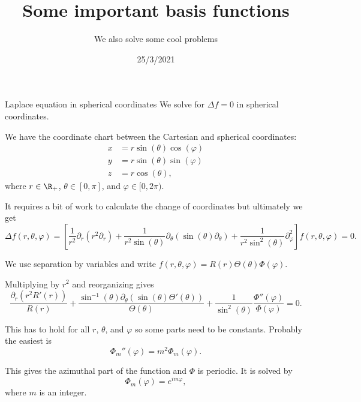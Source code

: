 

\title{Some important basis functions}
\subtitle{We also solve some cool problems}
\date{25/3/2021}
\date{}


	
	\maketitle
	

\begin{frame}{Laplace equation in spherical coordinates}
	We solve for $ \Delta f = 0 $ in spherical coordinates.
	
	\pause
	We have the coordinate chart between the Cartesian and spherical coordinates:
	\[  
	\begin{split}
		x &= r \sin(\theta) \cos(\varphi) \\
		y &= r \sin(\theta) \sin(\varphi) \\
		z &= r \cos(\theta),
	\end{split}
	\]
	where $ r \in \R_+ $, $ \theta \in [0,\pi] $, and $ \varphi \in [0,2\pi) $.
	
	\pause
	It requires a bit of work to calculate the change of coordinates but ultimately we get 
	\[ \Delta f(r, \theta, \varphi) = \left[ 
	\frac{1}{r^2} \partial_r \left(r^2 \partial_r \right) 
	+ \frac{1}{r^2 \sin(\theta)} \partial_\theta \left( \sin(\theta) \partial_\theta \right)
	+ \frac{1}{r^2 \sin^2(\theta)} \partial_{\varphi}^2 
	\right] f(r,\theta,\varphi) = 0.
	\]
	
	\pause
	We use separation by variables and write $ f(r,\theta,\varphi) = R(r)\Theta(\theta) \Phi(\varphi) $.
\end{frame}

\begin{frame}
	Multiplying by $ r^2 $ and reorganizing gives
	\[ \frac{\partial_r \left(r^2 R'(r) \right)}{R(r)} 
	+ \frac{\sin^{-1}(\theta) \partial_\theta \left( \sin(\theta) \Theta '(\theta) \right)}{\Theta(\theta)} + \frac{1}{\sin^2(\theta)} \frac{\Phi''(\varphi)}{\Phi(\varphi)} = 0.
	\]
	
	\pause
	This has to hold for all $ r $, $ \theta $, and $ \varphi $ so some parts need to be constants. Probably the easiest is 
	\[ \Phi_m''(\varphi) = m^2 \Phi_m(\varphi). \]
	
	\pause
	This gives the azimuthal part of the function and $ \Phi $ is periodic. It is solved by 
	\[ \Phi_m(\varphi) = e^{i m \varphi}, \]
	where $ m $ is an integer. 
\end{frame}

